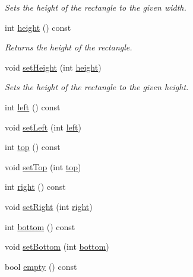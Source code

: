 \begin{DoxyCompactItemize}
\begin{DoxyCompactList}\small\item\em Sets the height of the rectangle to the given {\ttfamily width}. \end{DoxyCompactList}\item 
\hypertarget{class_f_f_l_d_1_1_rectangle_a51fcde43e3b8803b7fcf3bba60167894}{int \hyperlink{class_f_f_l_d_1_1_rectangle_a51fcde43e3b8803b7fcf3bba60167894}{height} () const }\label{class_f_f_l_d_1_1_rectangle_a51fcde43e3b8803b7fcf3bba60167894}

\begin{DoxyCompactList}\small\item\em Returns the height of the rectangle. \end{DoxyCompactList}\item 
\hypertarget{class_f_f_l_d_1_1_rectangle_a1b4e8ba25c9c58078bfe32a3a673e5c4}{void \hyperlink{class_f_f_l_d_1_1_rectangle_a1b4e8ba25c9c58078bfe32a3a673e5c4}{set\-Height} (int \hyperlink{class_f_f_l_d_1_1_rectangle_a51fcde43e3b8803b7fcf3bba60167894}{height})}\label{class_f_f_l_d_1_1_rectangle_a1b4e8ba25c9c58078bfe32a3a673e5c4}

\begin{DoxyCompactList}\small\item\em Sets the height of the rectangle to the given {\ttfamily height}. \end{DoxyCompactList}\item 
int \hyperlink{class_f_f_l_d_1_1_rectangle_a1f169cef3c9b8307e8dc7c6093bfdd14}{left} () const 
\item 
void \hyperlink{class_f_f_l_d_1_1_rectangle_a6e47a615867757086d45c09933a56e98}{set\-Left} (int \hyperlink{class_f_f_l_d_1_1_rectangle_a1f169cef3c9b8307e8dc7c6093bfdd14}{left})
\item 
int \hyperlink{class_f_f_l_d_1_1_rectangle_a8eb6de2c6d532b2175bddd8484196eab}{top} () const 
\item 
void \hyperlink{class_f_f_l_d_1_1_rectangle_ab11acc9bfeac1a101a782940ffca3fe1}{set\-Top} (int \hyperlink{class_f_f_l_d_1_1_rectangle_a8eb6de2c6d532b2175bddd8484196eab}{top})
\item 
int \hyperlink{class_f_f_l_d_1_1_rectangle_a8e76ee84d39c8c063cb2ef0e1cb7f5df}{right} () const 
\item 
void \hyperlink{class_f_f_l_d_1_1_rectangle_a117a6dd33b2c14c4174b8bc3e6d6359b}{set\-Right} (int \hyperlink{class_f_f_l_d_1_1_rectangle_a8e76ee84d39c8c063cb2ef0e1cb7f5df}{right})
\item 
int \hyperlink{class_f_f_l_d_1_1_rectangle_a46e18ff7c2ca4fd068442cabcd0b4046}{bottom} () const 
\item 
void \hyperlink{class_f_f_l_d_1_1_rectangle_aa24e8b49533195c056493b094ff716cc}{set\-Bottom} (int \hyperlink{class_f_f_l_d_1_1_rectangle_a46e18ff7c2ca4fd068442cabcd0b4046}{bottom})
\item 
\hypertarget{class_f_f_l_d_1_1_rectangle_a33ca9f7369ce59fd11effe229d1cb8e4}{bool \hyperlink{class_f_f_l_d_1_1_rectangle_a33ca9f7369ce59fd11effe229d1cb8e4}{empty} () const }\label{class_f_f_l_d_1_1_rectangle_a33ca9f7369ce59fd11effe229d1cb8e4}


\end{DoxyCompactItemize}
